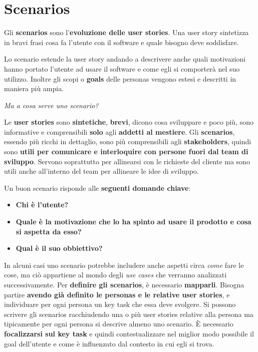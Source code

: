 \documentclass[a4paper,11pt,oneside]{book}
\begin{document}
\section{Scenarios}

Gli \textbf{scenarios} sono l'\textbf{evoluzione delle user stories}. Una user story sintetizza in bravi frasi cosa fa l'utente con il software e quale bisogno deve soddisfare.

Lo scenario estende la user story andando a descrivere anche quali motivazioni hanno portato l'utente ad usare il software e come egli si comporterà nel suo utilizzo. Inoltre gli scopi o \textbf{goals} delle personas vengono estesi e descritti in maniera più ampia.

\begin{flushleft}
	\textit{Ma a cosa serve uno scenario?}
\end{flushleft}

Le \textbf{user stories} sono \textbf{sintetiche}, \textbf{brevi}, dicono cosa sviluppare e poco più, sono informative e comprensibili \textbf{solo} agli \textbf{addetti al mestiere}. Gli \textbf{scenarios}, essendo più ricchi in dettaglio, sono più comprensibili agli \textbf{stakeholders}, quindi sono \textbf{utili per comunicare e interloquire con persone fuori dal team di sviluppo}. Servono soprattutto per allinearsi con le richieste del cliente ma sono  utili anche all'interno del team per allineare le idee di sviluppo.

Un buon scenario risponde alle \textbf{seguenti domande chiave}:

\begin{itemize}
	\item \textbf{Chi è l'utente?}
	\item \textbf{Quale è la motivazione che lo ha spinto ad usare il prodotto e cosa si aspetta da esso?}
	\item \textbf{Qual è il suo obbiettivo?}
\end{itemize}

In alcuni casi uno scenario potrebbe includere anche aspetti circa \textit{come} fare le cose, ma ciò appartiene al mondo degli \textit{use cases} che verranno analizzati successivamente.
Per \textbf{definire gli scenarios}, è necessario \textbf{mapparli}. Bisogna partire \textbf{avendo già definito le personas e le relative user stories}, e individuare per ogni persona un key task che essa deve svolgere. Si possono scrivere gli scenarios racchiudendo una o più
user stories relative alla persona ma tipicamente per ogni persona si descrive  almeno uno scenario. È necessario \textbf{focalizzarsi sul key task} e quindi contestualizzare nel miglior modo possibile il goal dell'utente e come è influenzato dal contesto in cui egli si trova.
\end{document}
